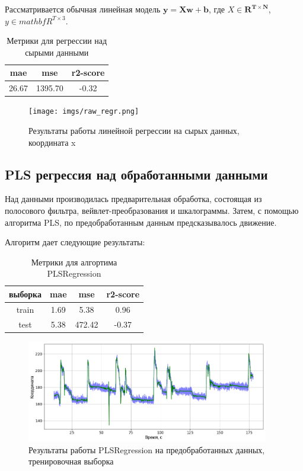 \documentclass{mipt-thesis-bs}
\begin{document}
Рассматривается обычная линейная модель $\mathbf{y} = \mathbf{X}\mathbf{w} + \mathbf{b}$, где $X\in\mathbf{R^{T\times N}}$, $y \in mathbf{R^{T\times 3}}$.

\begin{table}[h]
  
  \centering
    \begin{tabular}{  | c | c | c | }
	\hline
	mae & mse & r2-score \\ \hline
	26.67 & 1395.70 & -0.32 \\
	\hline
	\end{tabular}
\caption{Метрики для регрессии над сырыми данными}
\label{table:raw_reg}
\end{table}

\begin{figure}[h]
\begin{center}
	\texttt{[image: imgs/raw\_regr.png]}
	\caption{Результаты работы линейной регрессии на сырых данных, координата x}	
	\label{fig:raw-reg}
	\end{center}
\end{figure}

\subsection{PLS регрессия над обработанными данными}

Над данными производилась предварительная обработка, состоящая из полосового фильтра, вейвлет-преобразования и шкалограммы. Затем, с помощью алгоритма PLS, по предобработанным данным предсказывалось движение.

Алгоритм дает следующие результаты:


\begin{table}[h]
  
  \centering
    \begin{tabular}{ | c | c | c | c | }
	\hline
	выборка &mae & mse & r2-score \\ \hline
	train &1.69 & 5.38 & 0.96 \\
	test & 5.38 & 472.42& -0.37\\
	\hline
	\end{tabular}
\caption{Метрики для алгортима PLSRegression}
\label{table:motrenko}
\end{table}

\begin{figure}[h]
\begin{center}
	\includegraphics[width=300pt,height=\textheight,keepaspectratio]{imgs/motrenko-train.png}
	\caption{Результаты работы PLSRegression на предобработанных данных, тренировочная выборка}	
	\label{fig:motr train}
	\end{center}
\end{figure}
\end{document}
